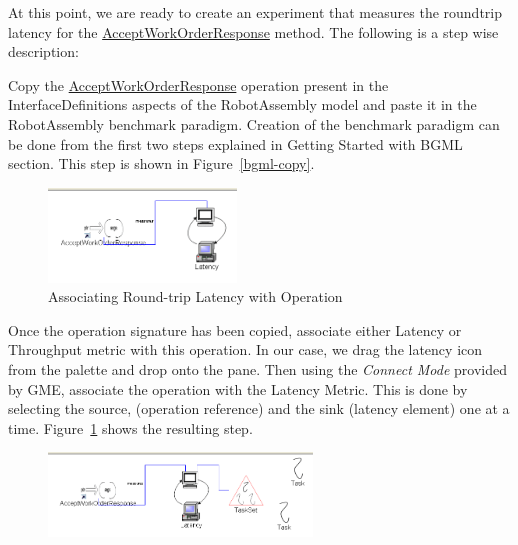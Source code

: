 \documentclass[onecolumn]{article}
\begin{document}
At this point, we are ready to create an experiment that measures the
roundtrip latency for the \url{AcceptWorkOrderResponse} method. The
following is a step wise description:

\smallskip
{} Copy the \url{AcceptWorkOrderResponse} operation
present in the InterfaceDefinitions aspects of the RobotAssembly model
and paste it in the RobotAssembly benchmark paradigm. Creation of the
benchmark paradigm can be done from the first two steps explained in
Getting Started with BGML section. This step is shown in
Figure~\ref{bgml-copy}.

\begin{figure}[ht]
{
 \includegraphics[width=5cm]{BGML-Latency.png}
 \caption{Associating Round-trip Latency with Operation}
 \label{bgml-latency}
}
\end{figure}

\smallskip
{} Once the operation signature has been copied,
associate either Latency or Throughput metric with this operation. In
our case, we drag the latency icon from the palette and drop onto the
pane. Then using the {\em Connect Mode} provided by GME, associate the
operation with the Latency Metric. This is done by selecting the
source, (operation reference) and the sink (latency element) one at a
time. Figure~\ref{bgml-latency} shows the resulting step.

\begin{figure}[ht]
{
 \includegraphics[width=7cm]{BGML-Latency-Complete.png}
 \label{task-complete}
}
\end{figure}
\end{document}

